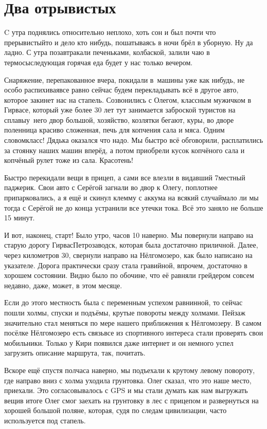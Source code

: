 \chapter{Два отрывистых}
\vepsianrose

C утра поднялись относительно неплохо, хоть сон и был почти что прерывистый\mdash то и дело кто нибудь, пошатываясь в ночи брёл в уборную. Ну да ладно. С утра позавтракали печеньками, колбаской, залили чаю в термосы\mdash следующая горячая еда будет у нас только вечером. 

Снаряжение, перепакованное вчера, покидали в~машины уже как нибудь, не особо распихивая\mdash все равно сейчас будем перекладывать всё в другое авто, которое закинет нас на стапель. Созвонились с Олегом, классным мужичком в Гирвасе, который уже более 30 лет тут занимается заброской туристов на сплавы\mdash у~него двор большой, хозяйство, козлятки бегают, куры, во дворе поленница красиво сложенная, печь для копчения сала и мяса. Одним словом\mdash класс! Дядька оказался что надо. Мы быстро всё обговорили, расплатились за стоянку наших машин вперёд, а потом приобрели кусок копчёного сала и копчёный рулет тоже из сала. Кра\sdash со\sdash тень! 

Быстро перекидали вещи в прицеп, а сами все влезли в видавший 7\sdash местный паджерик. Свои авто с Серёгой загнали во двор к Олегу, поплотнее припарковались, а я ещё и скинул клемму с аккума на всякий случай\mdash мало ли мы тогда с Серёгой не до конца устранили все утечки тока. Всё это заняло не больше 15 минут.

И вот, наконец, старт! Было утро, часов 10 наверно. Мы повернули направо на старую дорогу Гирвас\mdash Петрозаводск, которая была достаточно приличной. Далее, через километров 30, свернули направо на Нёлгомозеро, как было написано на указателе. Дорога практически сразу стала гравийной, впрочем, достаточно в хорошем состоянии. Видно было по обочине, что её равняли грейдером совсем недавно, даже, может, в этом месяце.

Если до этого местность была с переменным успехом равнинной, то сейчас пошли холмы, спуски и подъёмы, крутые повороты между холмами. Пейзаж значительно стал меняться по мере нашего приближения к Нёлгомозеру. В самом посёлке Нёлгомозеро есть связь\mdash все из спортивного интереса стали проверять свои мобильники. Только у Кири появился даже интернет и он немного успел загрузить описание маршрута, так, почитать. 

Вскоре ещё спустя полчаса наверно, мы подъехали к крутому левому повороту, где направо вниз с холма уходила грунтовка. Олег сказал, что это наше место, приехали. Это согласовывалось с GPS и мы стали думать как нам выгружать вещи\mdash в итоге Олег смог заехать на грунтовку в лес с прицепом и развернуться на хорошей большой поляне, которая, судя по следам цивилизации, часто используется под стапель.


\begin{center}
\end{center}
